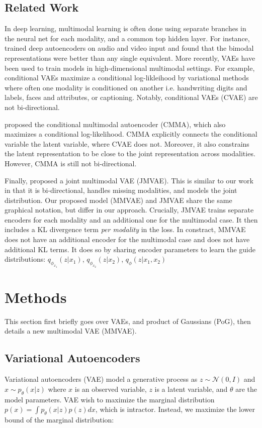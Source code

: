 \documentclass{article}
\begin{document}
\subsection{Related Work}
In deep learning, multimodal learning is often done using separate branches in the neural net for each modality, and a common top hidden layer. For instance, \citet{ngiam2011multimodal} trained deep autoencoders on audio and video input and found that the bimodal representations were better than any single equivalent. More recently, VAEs \cite{kingma2013auto, kingma2014semi} have been used to train models in high-dimensional multimodal settings. For example, conditional VAEs \cite{sohn2015learning} maximize a conditional log-likleihood by variational methods where often one modality is conditioned on another i.e. handwriting digits and labels, faces and attributes, or captioning. Notably, conditional VAEs (CVAE) are not bi-directional. 

\citet{pandey2017variational} proposed the conditional multimodal autoencoder (CMMA), which also maximizes a conditional log-likelihood. CMMA explicitly connects the conditional variable the latent variable, where CVAE does not. Moreover, it also constrains the latent representation to be close to the joint representation across modalities. However, CMMA is still not bi-directional.

Finally, \citet{suzuki2016joint} proposed a joint multimodal VAE (JMVAE). This is similar to our work in that it is bi-directional, handles missing modalities, and models the joint distribution. Our proposed model (MMVAE) and JMVAE share the same graphical notation, but differ in our approach. Crucially, JMVAE trains separate encoders for each modality and an additional one for the multimodal case. It then includes a KL divergence term \textit{per modality} in the loss. In constract, MMVAE does not have an additional encoder for the multimodal case and does not have additional KL terms. It does so by sharing encoder parameters to learn the guide distributions: $q_{\phi_{x_{1}}}(z|x_{1})$, $q_{\phi_{x_{2}}}(z|x_{2})$, $q_{\phi}(z|x_{1}, x_{2})$

\section{Methods}
This section first briefly goes over VAEs, and product of Gaussians (PoG), then details a new multimodal VAE (MMVAE).

\subsection{Variational Autoencoders}
Variational autoencoders (VAE) model a generative process as $z \sim \mathcal{N}(0, I)$ and $x \sim p_{\theta}(x | z)$ where $x$ is an observed variable, $z$ is a latent variable, and $\theta$ are the model parameters. VAE wish to maximize the marginal distribution $p(x) = \int p_{\theta}(x | z)p(z)dx$, which is intractor. Instead, we maximize the lower bound of the marginal distribution:
\end{document}
